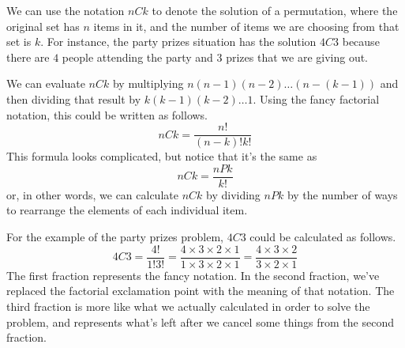 \documentclass{ximera}
\begin{document}
We can use the notation $nCk$ to denote the solution of a permutation, where the original set has $n$ items in it, and the number of items we are choosing from that set is $k$. For instance, the party prizes situation has the solution $4C3$ because there are $4$ people attending the party and $3$ prizes that we are giving out. 

We can evaluate $nCk$ by multiplying $n (n-1) (n-2) \dots (n-(k-1))$ and then dividing that result by $k (k-1) (k-2) \dots 1$. Using the fancy factorial notation, this could be written as follows.
\[
nCk = \frac{n!}{(n-k)! k!}
\]
This formula looks complicated, but notice that it's the same as
\[
nCk = \frac{nPk}{k!}
\]
or, in other words, we can calculate $nCk$ by dividing $nPk$ by the number of ways to rearrange the elements of each individual item. 


For the example of the party prizes problem, $4C3$ could be calculated as follows.
\[
4C3 = \frac{4!}{1!3!} =\frac{4 \times 3 \times 2 \times 1}{1 \times 3 \times 2 \times 1} =  \frac{4 \times 3 \times 2}{3 \times 2 \times 1}
\]
The first fraction represents the fancy notation. In the second fraction, we've replaced the factorial exclamation point with the meaning of that notation. The third fraction is more like what we actually calculated in order to solve the problem, and represents what's left after we cancel some things from the second fraction.
\end{document}
